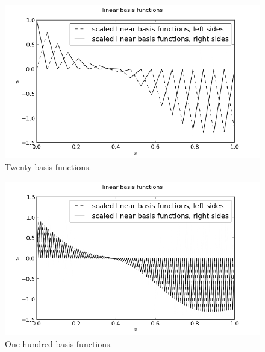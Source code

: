 \documentclass[10pt]{article}
\begin{document}
\begin{figure}[ht]
    \centering
    \includegraphics[width=\columnwidth,keepaspectratio=true]{./hw7-basis_functions-N20.png}
    \caption{Twenty basis functions.}
    \label{fig:N20}
\end{figure}

\begin{figure}[ht]
    \centering
    \includegraphics[width=\columnwidth,keepaspectratio=true]{./hw7-basis_functions-N100.png}
    \caption{One hundred basis functions.}
    \label{fig:N100}
\end{figure}
\end{document}
